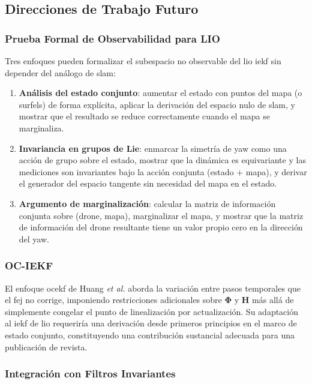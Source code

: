 \subsection{Direcciones de Trabajo Futuro}

\subsubsection{Prueba Formal de Observabilidad para LIO}

Tres enfoques pueden formalizar el subespacio no observable del \gls{lio}
\gls{iekf} sin depender del análogo de \gls{slam}:

\begin{enumerate}
    \item \textbf{Análisis del estado conjunto}: aumentar el estado con puntos
    del mapa (o surfels) de forma explícita, aplicar la derivación del espacio
    nulo de \gls{slam}, y mostrar que el resultado se reduce correctamente
    cuando el mapa se marginaliza.
    \item \textbf{Invariancia en grupos de Lie}: enmarcar la simetría de yaw
    como una acción de grupo sobre el estado, mostrar que la dinámica es
    equivariante y las mediciones son invariantes bajo la acción conjunta
    (estado + mapa), y derivar el generador del espacio tangente sin necesidad
    del mapa en el estado.
    \item \textbf{Argumento de marginalización}: calcular la matriz de
    información conjunta sobre (drone, mapa), marginalizar el mapa, y mostrar
    que la matriz de información del drone resultante tiene un valor propio
    cero en la dirección del yaw.
\end{enumerate}

\subsubsection{OC-IEKF}

El enfoque \gls{ocekf} de Huang \emph{et al.} aborda la variación entre pasos
temporales que el \gls{fej} no corrige, imponiendo restricciones adicionales
sobre $\boldsymbol{\Phi}$ y $\mathbf{H}$ más allá de simplemente congelar el
punto de linealización por actualización. Su adaptación al \gls{iekf} de
\gls{lio} requeriría una derivación desde primeros principios en el marco de
estado conjunto, constituyendo una contribución sustancial adecuada para una
publicación de revista.

\subsubsection{Integración con Filtros Invariantes}


